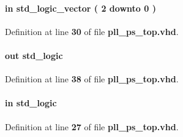 \paragraph[{ps\+\_\+cnt}]{ {\bfseries \textcolor{keywordflow}{in}\textcolor{vhdlchar}{ }} {\bfseries \textcolor{comment}{std\+\_\+logic\+\_\+vector}\textcolor{vhdlchar}{ }\textcolor{vhdlchar}{(}\textcolor{vhdlchar}{ }\textcolor{vhdlchar}{ } \textcolor{vhdldigit}{2} \textcolor{vhdlchar}{ }\textcolor{keywordflow}{downto}\textcolor{vhdlchar}{ }\textcolor{vhdlchar}{ } \textcolor{vhdldigit}{0} \textcolor{vhdlchar}{ }\textcolor{vhdlchar}{)}\textcolor{vhdlchar}{ }} \hspace{0.3cm}{\ttfamily [Port]}}\label{classpll__ps__top_ab4f3dc07b28d01efd37b5cb899456626}


Definition at line {\bf 30} of file {\bf pll\+\_\+ps\+\_\+top.\+vhd}.

\paragraph[{ps\+\_\+done}]{ {\bfseries \textcolor{keywordflow}{out}\textcolor{vhdlchar}{ }} {\bfseries \textcolor{comment}{std\+\_\+logic}\textcolor{vhdlchar}{ }} \hspace{0.3cm}{\ttfamily [Port]}}\label{classpll__ps__top_a30b0d39bdafc8f9aac9749f9fe5070f9}


Definition at line {\bf 38} of file {\bf pll\+\_\+ps\+\_\+top.\+vhd}.

\paragraph[{ps\+\_\+en}]{ {\bfseries \textcolor{keywordflow}{in}\textcolor{vhdlchar}{ }} {\bfseries \textcolor{comment}{std\+\_\+logic}\textcolor{vhdlchar}{ }} \hspace{0.3cm}{\ttfamily [Port]}}\label{classpll__ps__top_aeb651745c857c378319a569e1aa0ffb1}


Definition at line {\bf 27} of file {\bf pll\+\_\+ps\+\_\+top.\+vhd}.

